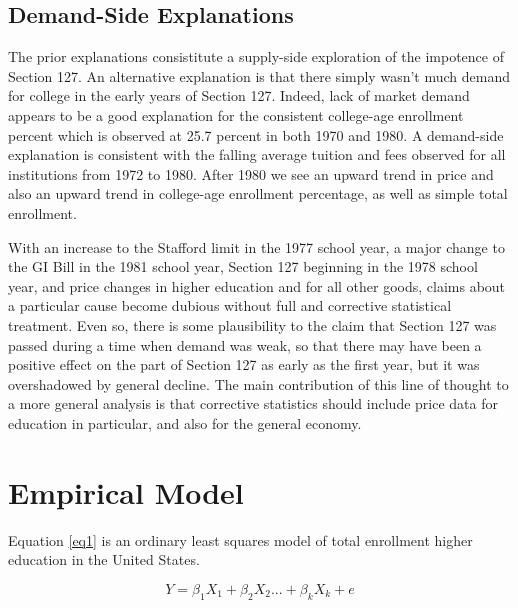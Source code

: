 \documentclass[review]{elsarticle}
\begin{document}
    \subsection{Demand-Side Explanations}
    The prior explanations consistitute a supply-side exploration of the impotence of Section 127.
    An alternative explanation is that there simply wasn't much demand for college in the early years of Section 127.
    Indeed, lack of market demand appears to be a good explanation for the consistent college-age enrollment percent
    which is observed at 25.7 percent in both 1970 and 1980.
    A demand-side explanation is consistent with the falling average tuition and fees observed for all institutions from 1972 to 1980.
    After 1980 we see an upward trend in price and also an upward trend in college-age enrollment percentage, as well as simple total enrollment.

    With an increase to the Stafford limit in the 1977 school year,
    a major change to the GI Bill in the 1981 school year,
    Section 127 beginning in the 1978 school year,
    and price changes in higher education and for all other goods,
    claims about a particular cause become dubious without full and corrective statistical treatment.
    Even so,
    there is some plausibility to the claim that Section 127 was passed during a time when demand was weak,
    so that there may have been a positive effect on the part of Section 127 as early as the first year,
    but it was overshadowed by general decline.
    The main contribution of this line of thought to a more general analysis is that corrective statistics should include price data
    for education in particular, and also for the general economy.

    \section{Empirical Model}

    Equation \ref{eq1} is an ordinary least squares model of total enrollment higher education in the United States.

    \begin{equation}
        Y = \beta_1X_1+\beta_2X_2...+\beta_kX_k+e
        \label{eq1}
    \end{equation}
\end{document}
